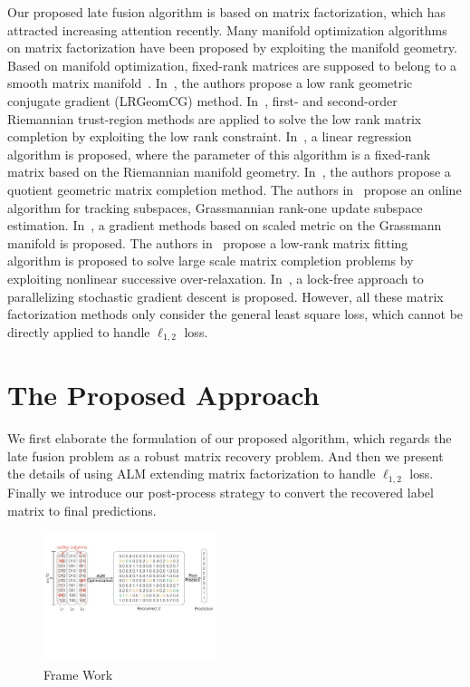 \documentclass[letterpaper]{article}
\begin{document}
Our proposed late fusion algorithm is based on matrix factorization,
which has attracted increasing attention recently.
Many manifold optimization algorithms on matrix factorization have been proposed by exploiting the manifold geometry.
Based on manifold optimization, fixed-rank matrices are supposed to belong to a smooth matrix manifold~\cite{Absil2008OAMM,vandereycken2013lowrank}.
In~\cite{vandereycken2013lowrank}, the authors propose a low rank geometric conjugate gradient (LRGeomCG) method.
In~\cite{rtrmc2011boumal}, first- and second-order Riemannian trust-region methods are applied to solve the low rank matrix completion by exploiting the low rank constraint.
In~\cite{Bonnabel2011}, a linear regression algorithm is proposed, where the parameter of this algorithm is a fixed-rank matrix based on the Riemannian manifold geometry.
In~\cite{Mishra2012}, the authors propose a quotient geometric matrix completion method.
The authors in~\cite{grouse2010Balzano} propose an online algorithm for tracking subspaces, Grassmannian rank-one update subspace estimation.
In~\cite{ngonips2012scaled}, a gradient methods based on scaled metric on the Grassmann manifold is proposed.
The authors in~\cite{Wen2012} propose a low-rank matrix fitting algorithm is proposed to solve large scale matrix completion problems by exploiting nonlinear successive over-relaxation.
In~\cite{RechtNIPS2011hogwild}, a lock-free approach to parallelizing stochastic gradient descent is proposed.
However, all these matrix factorization methods only consider the general least square loss, which cannot be directly applied to handle $\ell_{1,2}$ loss.




\section{The Proposed Approach}

We first elaborate the formulation of our proposed algorithm,
which regards the late fusion problem as a robust matrix recovery problem.
And then we present the details of using ALM extending matrix factorization to handle $\ell_{1,2}$ loss.
Finally we introduce our post-process strategy to convert the recovered label matrix to final predictions.

\begin{figure}[h]
\centering\includegraphics[width=0.45\textwidth]{resource/frame_work.pdf}
\caption{Frame Work}
\label{fig:framework}
\end{figure}
\end{document}

